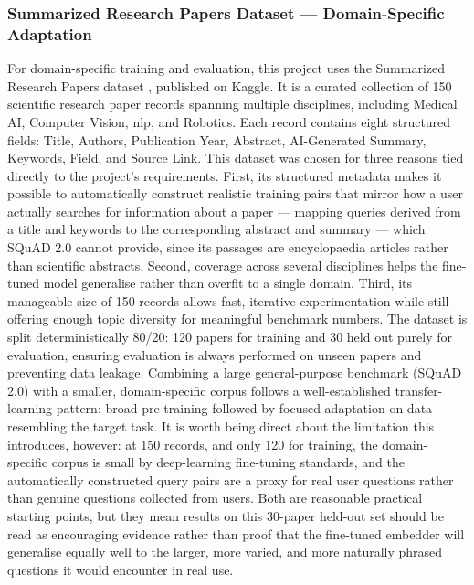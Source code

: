 \subsubsection{Summarized Research Papers Dataset — Domain-Specific Adaptation}

For domain-specific training and evaluation, this project uses the Summarized Research Papers dataset \citep{tyagi2024summarized}, published on Kaggle. It is a curated collection of 150 scientific research paper records spanning multiple disciplines, including Medical AI, Computer Vision, \gls{nlp}, and Robotics. Each record contains eight structured fields: Title, Authors, Publication Year, Abstract, AI-Generated Summary, Keywords, Field, and Source Link.
\newline \newline This dataset was chosen for three reasons tied directly to the project's requirements. First, its structured metadata makes it possible to automatically construct realistic training pairs that mirror how a user actually searches for information about a paper — mapping queries derived from a title and keywords to the corresponding abstract and summary — which SQuAD 2.0 cannot provide, since its passages are encyclopaedia articles rather than scientific abstracts.   Second, coverage across several disciplines helps the fine-tuned model generalise rather than overfit to a single domain. Third, its manageable size of 150 records allows fast, iterative experimentation while still offering enough topic diversity for meaningful benchmark numbers.
\newline \newline The dataset is split deterministically 80/20: 120 papers for training and 30 held out purely for evaluation, ensuring evaluation is always performed on unseen papers and preventing data leakage.
\newline \newline Combining a large general-purpose benchmark (SQuAD 2.0) with a smaller, domain-specific corpus follows a well-established transfer-learning pattern: broad pre-training followed by focused adaptation on data resembling the target task. It is worth being direct about the limitation this introduces, however: at 150 records, and only 120 for training, the domain-specific corpus is small by deep-learning fine-tuning standards, and the automatically constructed query pairs are a proxy for real user questions rather than genuine questions collected from users. Both are reasonable practical starting points, but they mean results on this 30-paper held-out set should be read as encouraging evidence rather than proof that the fine-tuned embedder will generalise equally well to the larger, more varied, and more naturally phrased questions it would encounter in real use.

